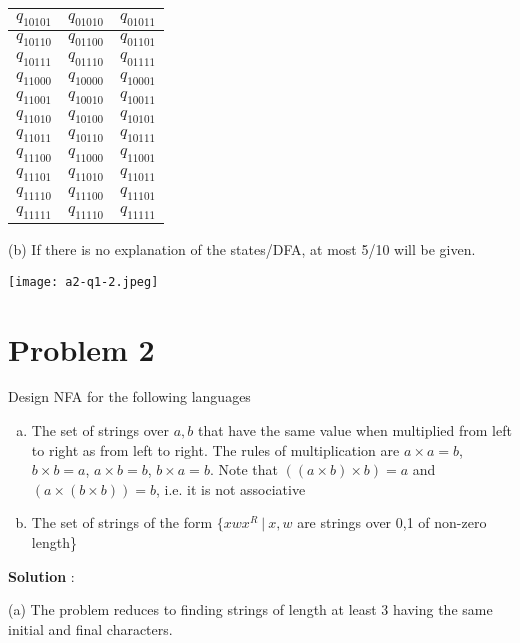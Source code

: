 \documentclass{article}
\begin{document}
\begin{longtable}{|c|c|c|}
      $q_{10101}$ & $q_{01010}$ & $q_{01011}$ \\ \hline
      $q_{10110}$ & $q_{01100}$ & $q_{01101}$ \\ \hline
      $q_{10111}$ & $q_{01110}$ & $q_{01111}$ \\ \hline
      $q_{11000}$ & $q_{10000}$ & $q_{10001}$ \\ \hline
      $q_{11001}$ & $q_{10010}$ & $q_{10011}$ \\ \hline
      $q_{11010}$ & $q_{10100}$ & $q_{10101}$ \\ \hline
      $q_{11011}$ & $q_{10110}$ & $q_{10111}$ \\ \hline
      $q_{11100}$ & $q_{11000}$ & $q_{11001}$ \\ \hline
      $q_{11101}$ & $q_{11010}$ & $q_{11011}$ \\ \hline
      $q_{11110}$ & $q_{11100}$ & $q_{11101}$ \\ \hline
      $q_{11111}$ & $q_{11110}$ & $q_{11111}$ \\ \hline
    \end{longtable}
    
    \newpage
    
    (b) If there is no explanation of the states/DFA, at most 5/10 will be given.
    \begin{center}
        \texttt{[image: a2-q1-2.jpeg]}
    \end{center}
    
    \section*{Problem 2} Design NFA for the following languages
    \begin{enumerate}[(a)]
        \item The set of strings over ${a, b}$ that have the same value when multiplied from left to right as from left to right. The rules of multiplication are $a \times a = b$, $b \times b = a$, $a \times b = b$, $b \times a = b$. Note that $((a \times b) \times b) = a$ and $(a \times (b \times b)) = b$, i.e. it is not associative
        \item The set of strings of the form $\{xwx^R ~|~ x, w$ are strings over 0,1 of non-zero length\}
    \end{enumerate}
    
    \textbf{Solution} : 

    (a) The problem reduces to finding strings of length at least 3 having the same initial and final characters. 
    
\end{document}
